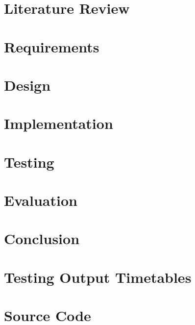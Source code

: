 \documentclass[a4paper, 12pt]{report}
\begin{document}
\chapter{Literature Review}


\chapter{Requirements}


\chapter{Design}


\chapter{Implementation}


\chapter{Testing}


\chapter{Evaluation}  %


\chapter{Conclusion}  %


\renewcommand\bibname{References}


\appendix

\listoffigures

\listoftables

\listoflistings

\chapter{Testing Output Timetables}


\chapter{Source Code}

\end{document}
